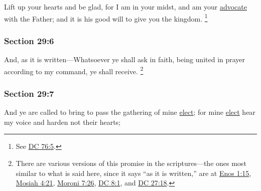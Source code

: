 		Lift up your hearts and be glad, for I am in your midst, and am your \hyperref[ADVOCATE]{advocate} with the Father; and it is his good will to give you the kingdom.%
			\footnote{%
				See \hyperref[DC76-5]{DC 76:5}.
				}


	\subsubsection{Section 29:6} %
		\label{DC29-6}

		And, as it is written---Whatsoever ye shall ask in faith, being united in prayer according to my command, ye shall receive.%
			\footnote{%
				There are various versions of this promise in the scriptures---the ones most similar to what is said here, since it says ``as it is written,'' are at \hyperref[ENOS-1-15]{Enos 1:15}, \hyperref[MOSIAH-4-21]{Mosiah 4:21}, \hyperref[MORONI-7-26]{Moroni 7:26}, \hyperref[DC8-1]{DC 8:1}, and \hyperref[DC27-18]{DC 27:18}.
				}


	\subsubsection{Section 29:7} %
		\label{DC29-7}

		And ye are called to bring to pass the gathering of mine \hyperref[ELECTION]{elect}; for mine \hyperref[ELECTION]{elect} hear my voice and harden not their hearts;

